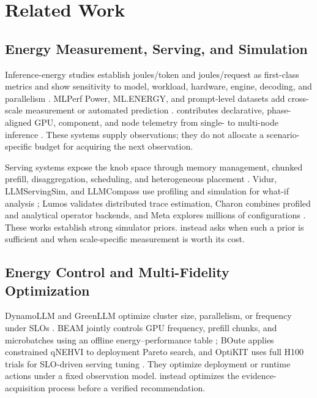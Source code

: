 \section{Related Work}

\subsection{Energy Measurement, Serving, and Simulation}

Inference-energy studies establish joules/token and joules/request as
first-class metrics and show sensitivity to model, workload, hardware, engine,
decoding, and parallelism
\cite{samsi2023words,fernandez2025energy,niu2025engines}.  MLPerf Power,
ML.ENERGY, and prompt-level datasets add cross-scale measurement or automated
prediction \cite{tschand2024mlperf,chung2025mlenergy,caravaca2025prompts}.
\bench{} contributes declarative, phase-aligned GPU, component, and node
telemetry from single- to multi-node inference \cite{niu2026tokenpowerbench}.
These systems supply observations; they do not allocate a scenario-specific
budget for acquiring the next observation.

Serving systems expose the knob space through memory management, chunked
prefill, disaggregation, scheduling, and heterogeneous placement
\cite{kwon2023vllm,agrawal2024sarathi,zhong2024distserve,
hong2025sola,jiang2025thunderserve}.  Vidur, LLMServingSim, and LLMCompass use
profiling and simulation for what-if analysis
\cite{agrawal2024vidur,cho2024llmservingsim,zhang2024llmcompass}; Lumos validates
distributed trace estimation, Charon combines profiled and analytical operator
backends, and Meta explores millions of configurations
\cite{liang2025lumos,yang2026charon,cho2026deployment}.  These works establish
strong simulator priors.  \system{} instead asks when such a prior is
sufficient and when scale-specific measurement is worth its cost.

\subsection{Energy Control and Multi-Fidelity Optimization}

DynamoLLM and GreenLLM optimize cluster size, parallelism, or frequency under
SLOs \cite{stojkovic2024dynamollm,liu2025greenllm}.  BEAM jointly controls GPU
frequency, prefill chunks, and microbatches using an offline energy--performance
table \cite{lee2026beam}; BOute applies constrained qNEHVI to deployment Pareto
search, and OptiKIT uses full H100 trials for SLO-driven serving tuning
\cite{jiang2026boute,santavas2026optikit}.  They optimize deployment or runtime
actions under a fixed observation model.  \system{} instead optimizes the
evidence-acquisition process before a verified recommendation.

